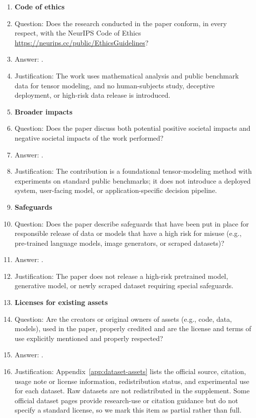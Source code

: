 \begin{enumerate}
\item {\bf Code of ethics}
    \item[] Question: Does the research conducted in the paper conform, in every respect, with the NeurIPS Code of Ethics \url{https://neurips.cc/public/EthicsGuidelines}?
    \item[] Answer: \answerYes{}.
    \item[] Justification: The work uses mathematical analysis and public benchmark data for tensor modeling, and no human-subjects study, deceptive deployment, or high-risk data release is introduced.

\item {\bf Broader impacts}
    \item[] Question: Does the paper discuss both potential positive societal impacts and negative societal impacts of the work performed?
    \item[] Answer: \answerNA{}.
    \item[] Justification: The contribution is a foundational tensor-modeling method with experiments on standard public benchmarks; it does not introduce a deployed system, user-facing model, or application-specific decision pipeline.

\item {\bf Safeguards}
    \item[] Question: Does the paper describe safeguards that have been put in place for responsible release of data or models that have a high risk for misuse (e.g., pre-trained language models, image generators, or scraped datasets)?
    \item[] Answer: \answerNA{}.
    \item[] Justification: The paper does not release a high-risk pretrained model, generative model, or newly scraped dataset requiring special safeguards.

\item {\bf Licenses for existing assets}
    \item[] Question: Are the creators or original owners of assets (e.g., code, data, models), used in the paper, properly credited and are the license and terms of use explicitly mentioned and properly respected?
    \item[] Answer: \answerPartial{}.
    \item[] Justification: Appendix~\ref{app:dataset-assets} lists the official source, citation, usage note or license information, redistribution status, and experimental use for each dataset. Raw datasets are not redistributed in the supplement. Some official dataset pages provide research-use or citation guidance but do not specify a standard license, so we mark this item as partial rather than full.


\end{enumerate}

